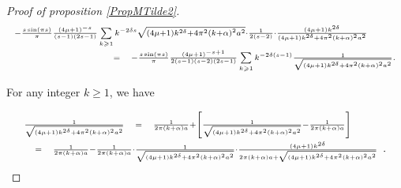 \documentclass{jams-l}
\theoremstyle{definition}
\theoremstyle{remark}
\numberwithin{equation}{section}
\begin{document}
\begin{proof}[Proof of proposition \ref{PropMTilde2}]
                        \[ \begin{array}{lll}
                                \multicolumn{3}{l}{\scriptstyle - \frac{s \sin \left( \pi s \right)}{\pi} \frac{\left( 4 \mu + 1 \right)^{-s}}{\left( s-1 \right) \left( 2s-1 \right)} \sum\limits_{k \geqslant 1} k^{-2 \delta s} \sqrt{\left( 4 \mu + 1 \right) k^{2 \delta} + 4 \pi^2 \left( k + \alpha \right)^2 a^2} \cdot \frac{1}{2 \left( s-2 \right)} \cdot \frac{\left( 4 \mu + 1 \right) k^{2 \delta}}{\left( 4 \mu + 1 \right) k^{2 \delta} + 4 \pi^2 \left( k + \alpha \right)^2 a^2}} \\[1em]
                                
                                \qquad \qquad \qquad \qquad & \scriptstyle = & \scriptstyle - \frac{s \sin \left( \pi s \right)}{\pi} \frac{\left( 4 \mu + 1 \right)^{-s+1}}{2 \left( s-1 \right) \left( s - 2 \right) \left( 2s-1 \right)} \sum\limits_{k \geqslant 1} k^{-2 \delta \left( s - 1 \right)} \frac{1}{\sqrt{\left( 4 \mu + 1 \right) k^{2 \delta} + 4 \pi^2 \left( k + \alpha \right)^2 a^2}}.
                            \end{array} \]
                        
                        \noindent For any integer $k \geqslant 1$, we have
                        
                        \[ \begin{array}{lllll}
                                \multicolumn{3}{l}{\scriptstyle \frac{1}{\sqrt{\left( 4 \mu + 1 \right) k^{2 \delta} + 4 \pi^2 \left( k + \alpha \right)^2 a^2}}} & \scriptstyle = & \scriptstyle \frac{1}{2 \pi \left( k + \alpha \right) a} + \left[ \frac{1}{\sqrt{\left( 4 \mu + 1 \right) k^{2 \delta} + 4 \pi^2 \left( k + \alpha \right)^2 a^2}} - \frac{1}{2 \pi \left( k + \alpha \right) a} \right] \\[1em]
                                
                                & \scriptstyle = & \multicolumn{3}{l}{\scriptstyle \frac{1}{2 \pi \left( k + \alpha \right) a} - \frac{1}{2 \pi \left( k + \alpha \right) a} \cdot \frac{1}{\sqrt{\left( 4 \mu + 1 \right) k^{2 \delta} + 4 \pi^2 \left( k + \alpha \right)^2 a^2}} \cdot \frac{\left( 4 \mu + 1 \right) k^{2 \delta}}{2 \pi \left( k + \alpha \right) a + \sqrt{\left( 4 \mu + 1 \right) k^{2 \delta} + 4 \pi^2 \left( k + \alpha \right)^2 a^2}}}.
                            \end{array} \]
                        

\end{proof}
\end{document}
